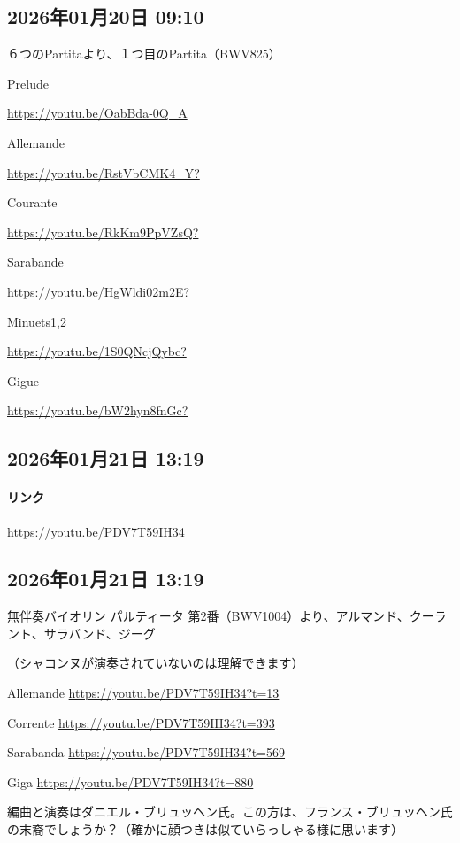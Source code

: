 \subsection*{2026年01月20日 09:10}

６つのPartitaより、１つ目のPartita（BWV825）

Prelude

\url{https://youtu.be/OabBda-0Q_A}

Allemande

\url{https://youtu.be/RstVbCMK4_Y?}

Courante

\url{https://youtu.be/RkKm9PpVZsQ?}

Sarabande

\url{https://youtu.be/HgWldi02m2E?}

Minuets1,2

\url{https://youtu.be/1S0QNcjQybc?}

Gigue

\url{https://youtu.be/bW2hyn8fnGc?}

\subsection*{2026年01月21日 13:19}

\paragraph{リンク}
\url{https://youtu.be/PDV7T59IH34}

\subsection*{2026年01月21日 13:19}

無伴奏バイオリン パルティータ 第2番（BWV1004）より、アルマンド、クーラント、サラバンド、ジーグ

（シャコンヌが演奏されていないのは理解できます）

Allemande \url{https://youtu.be/PDV7T59IH34?t=13}

Corrente \url{https://youtu.be/PDV7T59IH34?t=393}

Sarabanda \url{https://youtu.be/PDV7T59IH34?t=569}

Giga \url{https://youtu.be/PDV7T59IH34?t=880}

編曲と演奏はダニエル・ブリュッヘン氏。この方は、フランス・ブリュッヘン氏の末裔でしょうか？（確かに顔つきは似ていらっしゃる様に思います）

